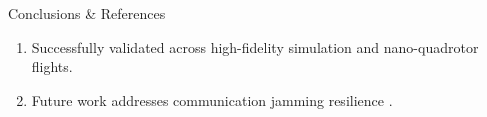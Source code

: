 \documentclass[aspectratio=169, 11pt]{beamer}
\begin{document}
\begin{frame}{Conclusions \& References}
    \begin{enumerate}
        \setlength{\itemsep}{0.6em}
        \item Successfully validated across high-fidelity simulation and nano-quadrotor flights.
        \item Future work addresses communication jamming resilience \cite{ieee_evans}.
    \end{enumerate}

    \vspace{1em}
    
    
\end{frame}
\end{document}

